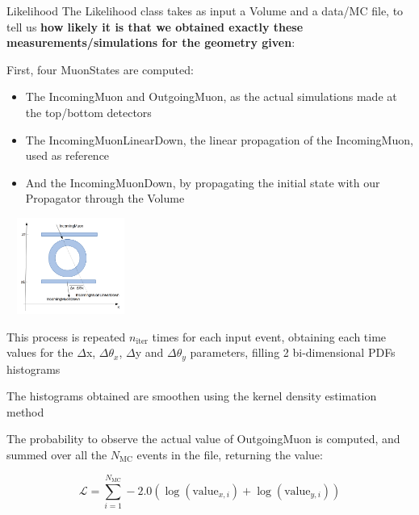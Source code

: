 \documentclass[8 pt]{beamer}
\begin{document}
\begin{frame}{Likelihood}
\justifying
The Likelihood class takes as input a Volume and a data/MC file, to tell us \textbf{how likely it is that we obtained exactly these measurements/simulations for the geometry given}: \vspace{5pt}

\begin{enumerate}
\begin{minipage}[c]{.58\textwidth}
\item First, four MuonStates are computed:
	\begin{itemize}
	\justifying
	\item The IncomingMuon and OutgoingMuon, as the actual simulations made at the top/bottom detectors
	\item The IncomingMuonLinearDown, the linear propagation of the IncomingMuon, used as reference
	\item And the IncomingMuonDown, by propagating the initial state with our Propagator through the Volume
	\end{itemize}
\end{minipage}
\begin{minipage}[c]{.36\textwidth}
\includegraphics[width=4.2cm, height=3.15cm]{figs/parameters.png}
\end{minipage} \vspace{5pt}

\justifying
\item This process is repeated $n_{\text{iter}}$ times for each input event, obtaining each time values for the $\Delta$x, $\Delta \theta_x$, $\Delta$y and $\Delta \theta_y$ parameters, filling 2 bi-dimensional PDFs histograms \vspace{5pt}
\item The histograms obtained are smoothen using the kernel density estimation method \vspace{5pt}
\item The probability to observe the actual value of OutgoingMuon is computed, and summed over all the ${N_\text{MC}}$ events in the file, returning the value:

\begin{equation*}
\label{eq:totallikelihood}
\mathcal{L} = \sum_{i = 1}^{N_\text{MC}} -2.0 \left ( \log(\text{value}_{x, i}) + \log(\text{value}_{y, i}) \right)
\end{equation*}
\end{enumerate} \vfill
\end{frame}
\end{document}
